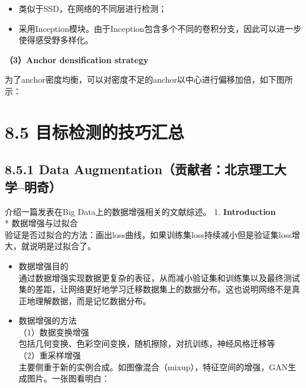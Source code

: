 \begin{itemize}
\item
  类似于SSD，在网络的不同层进行检测；
\item
  采用Inception模块。由于Inception包含多个不同的卷积分支，因此可以进一步使得感受野多样化。
\end{itemize}

\textbf{（3）Anchor densification strategy}

为了anchor密度均衡，可以对密度不足的anchor以中心进行偏移加倍，如下图所示：

\begin{figure}
\centering
\caption{}
\end{figure}

\section{8.5
目标检测的技巧汇总}\label{ux76eeux6807ux68c0ux6d4bux7684ux6280ux5de7ux6c47ux603b}

\subsection{8.5.1 Data
Augmentation（贡献者：北京理工大学--明奇）}\label{data-augmentationux8d21ux732eux8005ux5317ux4eacux7406ux5de5ux5927ux5b66ux660eux5947}

介绍一篇发表在Big Data上的数据增强相关的文献综述。 1.
\textbf{Introduction}\\
* 数据增强与过拟合\\
验证是否过拟合的方法：画出loss曲线，如果训练集loss持续减小但是验证集loss增大，就说明是过拟合了。

\begin{figure}
\centering
\caption{}
\end{figure}

\begin{itemize}
\item
  数据增强目的\\
  通过数据增强实现数据更复杂的表征，从而减小验证集和训练集以及最终测试集的差距，让网络更好地学习迁移数据集上的数据分布。这也说明网络不是真正地理解数据，而是记忆数据分布。
\item
  数据增强的方法\\
  （1）数据变换增强\\
  包括几何变换、色彩空间变换，随机擦除，对抗训练，神经风格迁移等\\
  （2）重采样增强\\
  主要侧重于新的实例合成。如图像混合（mixup），特征空间的增强，GAN生成图片。一张图看明白：
\end{itemize}

